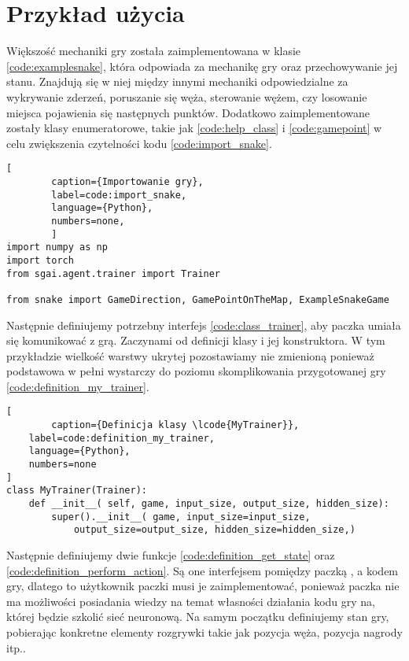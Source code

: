 \clearpage

\section{Przykład użycia}

Większość mechaniki gry została zaimplementowana w klasie  \ref{code:examplesnake}, która odpowiada za mechanikę gry oraz przechowywanie jej stanu. Znajdują się w niej między innymi mechaniki odpowiedzialne za wykrywanie zderzeń, poruszanie się węża, sterowanie wężem, czy losowanie miejsca pojawienia się następnych punktów. Dodatkowo zaimplementowane zostały klasy enumeratorowe, takie jak  \ref{code:help_class} i  \ref{code:gamepoint} w celu zwiększenia czytelności kodu \ref{code:import_snake}.

\begin{onepage}
    \begin{lstlisting}[
        caption={Importowanie gry},
        label=code:import_snake,
        language={Python},
        numbers=none,
        ]
import numpy as np
import torch
from sgai.agent.trainer import Trainer

from snake import GameDirection, GamePointOnTheMap, ExampleSnakeGame
    \end{lstlisting}
\end{onepage}



Następnie definiujemy potrzebny interfejs  \ref{code:class_trainer}, aby paczka  umiała się komunikować z grą. Zaczynami od definicji klasy i jej konstruktora. W tym przykładzie wielkość warstwy ukrytej pozostawiamy nie zmienioną ponieważ podstawowa w pełni wystarczy do poziomu skomplikowania przygotowanej gry \ref{code:definition_my_trainer}.

\begin{onepage}
    \begin{lstlisting}[
        caption={Definicja klasy \lcode{MyTrainer}},
    label=code:definition_my_trainer,
    language={Python},
    numbers=none
]
class MyTrainer(Trainer):
    def __init__( self, game, input_size, output_size, hidden_size):
        super().__init__( game, input_size=input_size,
            output_size=output_size, hidden_size=hidden_size,)
    \end{lstlisting}
\end{onepage}

Następnie definiujemy dwie funkcje  \ref{code:definition_get_state} oraz  \ref{code:definition_perform_action}. Są one interfejsem pomiędzy paczką , a kodem gry, dlatego to użytkownik paczki musi je zaimplementować, ponieważ paczka nie ma możliwości posiadania wiedzy na temat własności działania kodu gry na, której będzie szkolić sieć neuronową. Na samym początku definiujemy stan gry, pobierając konkretne elementy rozgrywki takie jak pozycja węża, pozycja nagrody itp..

